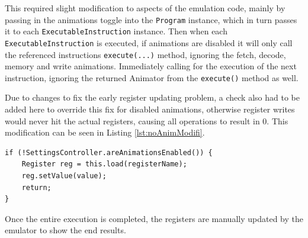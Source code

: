 This required slight modification to aspects of the emulation code, mainly by passing in the animations toggle into the \texttt{Program} instance, which in turn passes it to each \texttt{ExecutableInstruction} instance. Then when each \texttt{ExecutableInstruction} is executed, if animations are disabled it will only call the referenced instructions \verb|execute(...)| method, ignoring the fetch, decode, memory and write animations. Immediately calling for the execution of the next instruction, ignoring the returned Animator from the \verb|execute()| method as well.

Due to changes to fix the early register updating problem, a check also had to be added here to override this fix for disabled animations, otherwise register writes would never hit the actual registers, causing all operations to result in 0. This modification can be seen in Listing \ref{lst:noAnimModifi}.

\begin{lstlisting}[caption={Modification to register \texttt{write(...)} for instance writing when animations are disabled}, label=lst:noAnimModifi]
if (!SettingsController.areAnimationsEnabled()) {
    Register reg = this.load(registerName);
    reg.setValue(value);
    return;
}
\end{lstlisting}

Once the entire execution is completed, the registers are manually updated by the emulator to show the end results.
